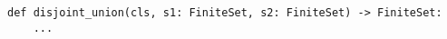 \begin{verbatim}
def disjoint_union(cls, s1: FiniteSet, s2: FiniteSet) -> FiniteSet:
    ...
\end{verbatim}